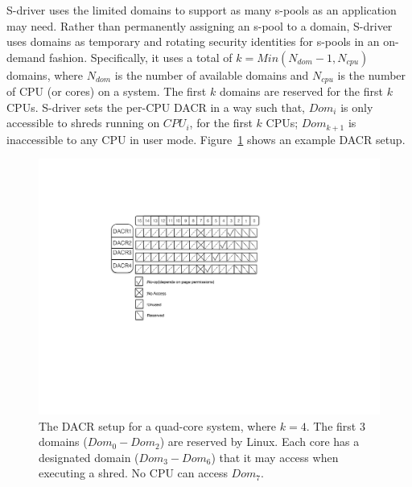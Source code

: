 S-driver uses the limited domains to support as many s-pools as an application may need. Rather than permanently assigning an s-pool to a domain, S-driver uses domains as temporary and rotating security identities for s-pools in an on-demand fashion. 
Specifically, it uses a total of $k=Min(N_{dom}-1, N_{cpu})$ domains, where $N_{dom}$ is the number of available domains and $N_{cpu}$ is the number of CPU (or cores) on a system. The first $k$ domains are reserved for the first $k$ CPUs. S-driver sets the per-CPU DACR in a way such that, 
$Dom_{i}$ is only accessible to shreds running on $CPU_{i}$, for the first $k$ CPUs; $Dom_{k+1}$ is inaccessible to any CPU in user mode. 
Figure~\ref{fig:dacr_setup} shows an example DACR setup.

\begin{figure}[t]
	\centering
	\begin{minipage}[b]{0.4\textwidth}
		\centering	
		\includegraphics[width=\textwidth]{shreds/figures/dacr}
		\caption{The DACR setup for a quad-core system, where $k=4$. The first 3 domains ($Dom_{0}-Dom_{2}$) are reserved by Linux. Each core has a designated domain ($Dom_{3}-Dom_{6}$) that it may access when executing a shred. No CPU can access $Dom_{7}$. 
		 }
		\label{fig:dacr_setup}
	\end{minipage}
 \hfill
	\begin{minipage}[b]{0.4\textwidth}
		\centering	

\end{minipage}
\end{figure}

